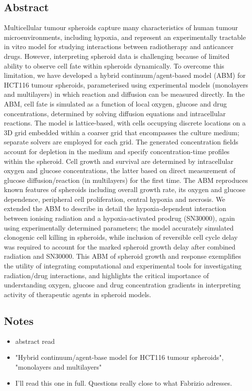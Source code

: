 \documentclass[11pt,a4paper]{article}
\begin{document}
\subsection*{Abstract}
Multicellular tumour spheroids capture many characteristics of human tumour microenvironments, including hypoxia, and represent an experimentally tractable in vitro model for studying interactions between radiotherapy and anticancer drugs. However, interpreting spheroid data is challenging because of limited ability to observe cell fate within spheroids dynamically. To overcome this limitation, we have developed a hybrid continuum/agent-based model (ABM) for HCT116 tumour spheroids, parameterised using experimental models (monolayers and multilayers) in which reaction and diffusion can be measured directly. In the ABM, cell fate is simulated as a function of local oxygen, glucose and drug concentrations, determined by solving diffusion equations and intracellular reactions. The model is lattice-based, with cells occupying discrete locations on a 3D grid embedded within a coarser grid that encompasses the culture medium; separate solvers are employed for each grid. The generated concentration fields account for depletion in the medium and specify concentration-time profiles within the spheroid. Cell growth and survival are determined by intracellular oxygen and glucose concentrations, the latter based on direct measurement of glucose diffusion/reaction (in multilayers) for the first time. The ABM reproduces known features of spheroids including overall growth rate, its oxygen and glucose dependence, peripheral cell proliferation, central hypoxia and necrosis. We extended the ABM to describe in detail the hypoxia-dependent interaction between ionising radiation and a hypoxia-activated prodrug (SN30000), again using experimentally determined parameters; the model accurately simulated clonogenic cell killing in spheroids, while inclusion of reversible cell cycle delay was required to account for the marked spheroid growth delay after combined radiation and SN30000. This ABM of spheroid growth and response exemplifies the utility of integrating computational and experimental tools for investigating radiation/drug interactions, and highlights the critical importance of understanding oxygen, glucose and drug concentration gradients in interpreting activity of therapeutic agents in spheroid models.

\subsection*{Notes}
\begin{itemize}
\item abstract read 
\item  "Hybrid continuum/agent-base model for HCT116 tumour spheroids", "monolayers and multilayers"
\item I'll read this one in full. Questions really close to what Fabrizio adresses.
\end{itemize}
\end{document}
